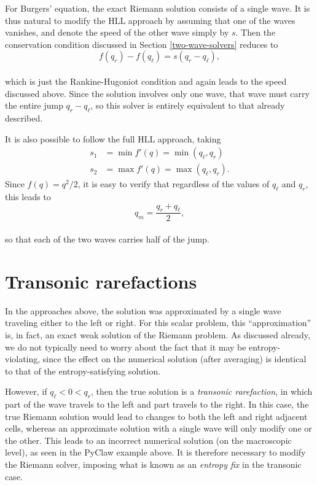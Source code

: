 \documentclass{SIAMbook2016}
\begin{document}
For Burgers' equation, the exact Riemann solution consists of a single
wave. It is thus natural to modify the HLL approach by assuming that one
of the waves vanishes, and denote the speed of the other wave simply by
\(s\). Then the conservation condition discussed in
Section \ref{two-wave-solvers} reduces to\\
\[f(q_r) - f(q_\ell) = s (q_r - q_\ell),\]\\
which is just the Rankine-Hugoniot condition and again leads to the
speed discussed above. Since the solution involves only one wave, that
wave must carry the entire jump \(q_r - q_\ell\), so this solver is
entirely equivalent to that already described.

It is also possible to follow the full HLL approach, taking
\begin{align*}
s_1 & = \min f'(q) = \min(q_\ell, q_r) \\
s_2 & = \max f'(q) = \max(q_\ell, q_r).
\end{align*} Since \(f(q) = q^2/2\), it is easy to verify that
regardless of the values of \(q_\ell\) and \(q_r\), this leads to\\
\[q_m = \frac{q_r + q_\ell}{2},\]\\
so that each of the two waves carries half of the jump.

\hypertarget{transonic-rarefactions}{%
\section{Transonic rarefactions}\label{transonic-rarefactions}}

In the approaches above, the solution was approximated by a single wave
traveling either to the left or right. For this scalar problem, this
``approximation'' is, in fact, an exact weak solution of the Riemann
problem. As discussed already, we do not typically need to worry about
the fact that it may be entropy-violating, since the effect on the
numerical solution (after averaging) is identical to that of the
entropy-satisfying solution.

However, if \(q_\ell < 0 < q_r\), then the true solution is a
\emph{transonic rarefaction}, in which part of the wave travels to the
left and part travels to the right. In this case, the true Riemann
solution would lead to changes to both the left and right adjacent
cells, whereas an approximate solution with a single wave will only
modify one or the other. This leads to an incorrect numerical solution
(on the macroscopic level), as seen in the PyClaw example above. It is
therefore necessary to modify the Riemann solver, imposing what is known
as an \emph{entropy fix} in the transonic case.
\end{document}
